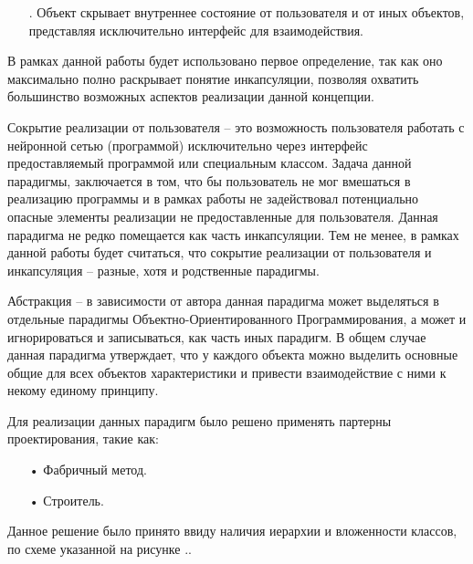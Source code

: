 {\begin{itemize}[leftmargin=2.15cm, labelwidth=0.65cm, labelsep=0.0cm]
	\item[\theitemcntr. ] Объект скрывает внутреннее состояние от пользователя и от иных объектов, представляя исключительно интерфейс для взаимодействия.
	\addtocounter{itemcntr}{1}
	
	\setcounter{itemcntr}{1}
\end{itemize}  

\par \redline В рамках данной работы будет использовано первое определение, так как оно максимально полно раскрывает понятие инкапсуляции, позволяя охватить большинство возможных аспектов реализации данной концепции.   

\par \redline Сокрытие реализации от пользователя {--} это возможность пользователя работать с нейронной сетью (программой) исключительно через интерфейс предоставляемый программой или специальным классом. Задача данной парадигмы, заключается в том, что бы пользователь не мог вмешаться в реализацию программы и в рамках работы не задействовал потенциально опасные элементы реализации не предоставленные для пользователя. Данная парадигма не редко помещается как часть инкапсуляции. Тем не менее, в рамках данной работы будет считаться, что сокрытие реализации от пользователя и инкапсуляция {--} разные, хотя и родственные парадигмы.

\par \redline Абстракция {--} в зависимости от автора данная парадигма может выделяться в отдельные парадигмы Объектно-Ориентированного Программирования, а может и игнорироваться и записываться, как часть иных парадигм. В общем случае данная парадигма утверждает, что у каждого объекта можно выделить основные общие для всех объектов характеристики и привести взаимодействие с ними к некому единому принципу.

\par \redline  Для реализации данных парадигм было решено применять партерны проектирования, такие как:

\begin{itemize}[leftmargin=2.15cm, labelwidth=0.65cm, labelsep=0.0cm] 
	
	\item[•] Фабричный метод.
	
	\item[•] Строитель. 
	
\end{itemize}

\par \redline  Данное решение было принято ввиду наличия иерархии и вложенности классов, по схеме указанной на рисунке \thechaptercntr.\theimagecntr.

}
